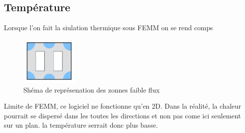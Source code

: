 \subsection{Température}

Lorsque l'on fait la siulation thermique sous FEMM on se rend comps 
\begin{figure}[ht]
	\begin{center}
	\includegraphics[width=0.25\textwidth]{images/TP3_zones_mortes}
	\caption{Shéma de représenation des zonnes faible flux}\label{img:RepChamps}
	\end{center}
\end{figure}

Limite de FEMM, ce logiciel ne fonctionne qu'en 2D. Dans la réalité, la chaleur pourrait se dispersé dans les toutes les directions et non pas come ici seulement sur un plan. la température serrait donc plus basse. 
